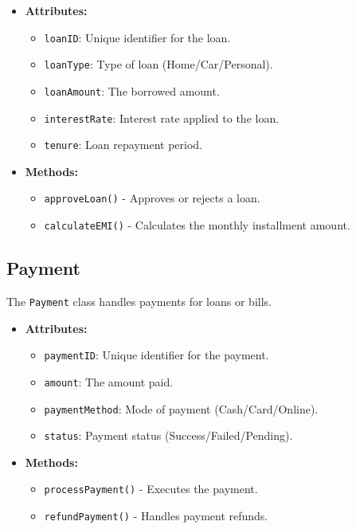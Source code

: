 \begin{itemize}
\item
  \textbf{Attributes:}

  \begin{itemize}
  \item
    \texttt{loanID}: Unique identifier for the loan.
  \item
    \texttt{loanType}: Type of loan (Home/Car/Personal).
  \item
    \texttt{loanAmount}: The borrowed amount.
  \item
    \texttt{interestRate}: Interest rate applied to the loan.
  \item
    \texttt{tenure}: Loan repayment period.
  \end{itemize}
\item
  \textbf{Methods:}

  \begin{itemize}
  \item
    \texttt{approveLoan}\texttt{(}\texttt{)} - Approves or rejects a
    loan.
  \item
    \texttt{calculateEMI}\texttt{(}\texttt{)} - Calculates the monthly
    installment amount.
  \end{itemize}
\end{itemize}

\subsection{Payment}\label{payment}

The \texttt{Payment} class handles payments for loans or bills.

\begin{itemize}
\item
  \textbf{Attributes:}

  \begin{itemize}
  \item
    \texttt{paymentID}: Unique identifier for the payment.
  \item
    \texttt{amount}: The amount paid.
  \item
    \texttt{paymentMethod}: Mode of payment (Cash/Card/Online).
  \item
    \texttt{status}: Payment status (Success/Failed/Pending).
  \end{itemize}
\item
  \textbf{Methods:}

  \begin{itemize}
  \item
    \texttt{processPayment}\texttt{(}\texttt{)} - Executes the payment.
  \item
    \texttt{refundPayment}\texttt{(}\texttt{)} - Handles payment
    refunds.
  \end{itemize}
\end{itemize}

